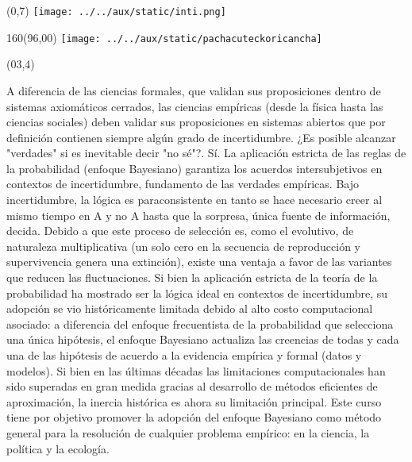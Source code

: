 \documentclass[shownotes,aspectratio=169]{beamer}
\begin{document}
\begin{frame}

\begin{textblock}{96}(0,7)\centering
{\texttt{[image: ../../aux/static/inti.png]}}
\end{textblock}

\begin{textblock}{160}(96,00)
\texttt{[image: ../../aux/static/pachacuteckoricancha]}
\end{textblock}

\begin{textblock}{90}(03,4) \scriptsize
\parbox{9cm}{A diferencia de las ciencias formales, que validan sus proposiciones dentro de sistemas axiomáticos cerrados, las ciencias empíricas (desde la física hasta las ciencias sociales) deben validar sus proposiciones en sistemas abiertos que por definición contienen siempre algún grado de incertidumbre. ¿Es posible alcanzar "verdades" si es inevitable decir "no sé"?. Sí. La aplicación estricta de las reglas de la probabilidad (enfoque Bayesiano) garantiza los acuerdos intersubjetivos en contextos de incertidumbre, fundamento de las verdades empíricas. Bajo incertidumbre, la lógica es paraconsistente en tanto se hace necesario creer al mismo tiempo en A y no A hasta que la sorpresa, única fuente de información, decida. Debido a que este proceso de selección es, como el evolutivo, de naturaleza multiplicativa (un solo cero en la secuencia de reproducción y supervivencia genera una extinción), existe una ventaja a favor de las variantes que reducen las fluctuaciones. Si bien la aplicación estricta de la teoría de la probabilidad ha mostrado ser la lógica ideal en contextos de incertidumbre, su adopción se vio históricamente limitada debido al alto costo computacional asociado: a diferencia del enfoque frecuentista de la probabilidad que selecciona una única hipótesis, el enfoque Bayesiano actualiza las creencias de todas y cada una de las hipótesis de acuerdo a la evidencia empírica y formal (datos y modelos). Si bien en las últimas décadas las limitaciones computacionales han sido superadas en gran medida gracias al desarrollo de métodos eficientes de aproximación, la inercia histórica es ahora su limitación principal. Este curso tiene por objetivo promover la adopción del enfoque Bayesiano como método general para la resolución de cualquier problema empírico: en la ciencia, la política y la ecología.}
\end{textblock}

\end{frame}
\end{document}
